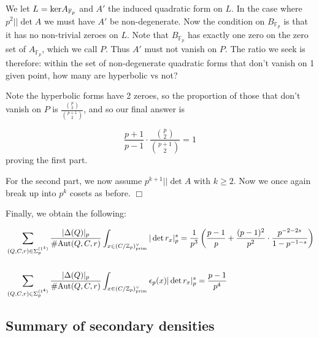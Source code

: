 \documentclass{article}
\def\binom#1#2{{#1\choose#2}}
\def\Z{{\mathbb Z}}
\def\Aut{{\rm Aut}}
\def\prim{{\rm prim}}
\def\ker{{\rm ker}}
\def\F{{\mathbb F}}
\def\Z{{\mathbb Z}}
\def\F{{\mathbb F}}
\newenvironment{proof}{\noindent {\bf Proof:}}{$\Box$ \vspace{2 ex}}
\begin{document}
\begin{proof}
     We let $L=\ker A_{\F_p}$ and $A'$ the induced quadratic form on $L$. 
    In the case where $p^2 || \det A$ we must have $A'$ be non-degenerate. 
    Now the condition on $B_{\F_p}$ is that it has no non-trivial zeroes on $L$. 
    Note that $B_{\F_p}$ has exactly one zero on the zero set of $A_{\F_p}$, which we call $P$. Thus $A'$ must not vanish on $P$. The ratio we seek is therefore: within the set of non-degenerate quadratic forms that don't vanish on 1 given point, how many are hyperbolic vs not?

    Note the hyperbolic forms have 2 zeroes, so the proportion of those that don't vanish on $P$ is $\frac{\binom{p}{2}}{\binom{p+1}{2}}$, and so our final answer is 

    $$\frac{p+1}{p-1}\cdot \frac{\binom{p}{2}}{\binom{p+1}{2}} = 1$$ proving the first part.

    For the second part, we now assume $p^{k+1}|| \det A$ with $k\geq 2$. Now we once again break up into $p^k$ cosets as before.
\end{proof}

Finally, we obtain the following:



\begin{align*}
&\displaystyle\sum_{(Q,C,r)\in\Sigma_p^{(1^4)}}\frac{|\Delta(Q)|_p}{\#\Aut(Q,C,r)}\int_{x\in (C/\Z_p)^{\vee}_{\prim}}  |\det{r_x}|_p^{s}=\frac{1}{p^3}\left(\frac{p-1}{p} + \frac{(p-1)^2}{p^2}\cdot \frac{p^{-2-2s}}{1-p^{-1-s}} \right)\\
&\\ &\displaystyle\sum_{(Q,C,r)\in\Sigma_p^{(1^4)}}\frac{|\Delta(Q)|_p}{\#\Aut(Q,C,r)}\int_{x\in (C/\Z_p)^{\vee}_{\prim}}  \epsilon_p(x)|\det{r_x}|_p^{s}= \frac{p-1}{p^4}
\end{align*}


\subsection{Summary of secondary densities}\label{sec:2ndmaintermvalues}
\end{document}
